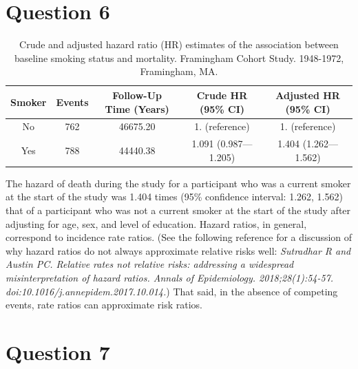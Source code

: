\documentclass{article}\usepackage[]{graphicx}\usepackage[]{color}
\newif\ifdraft  %
\begin{document}
\pagebreak

\section*{Question 6}

\ifdraft

Complete the following table. How would you interpret the parameter estimate that compares smokers to non-smokers in the \textbf{adjusted model}? What measure of association common in epidemiologic research does this correspond to? \textbf{(10 points)}

\fi







\begin{table}[H]
\centering
\parbox{13cm}{\caption{Crude and adjusted hazard ratio (HR) estimates of the association between baseline smoking status and mortality. Framingham Cohort Study. 1948-1972, Framingham, MA.}} 
\begin{tabular}{ccccc}
  \hline
Smoker & Events & Follow-Up Time (Years) & Crude HR (95\% CI) & Adjusted HR (95\% CI) \\ 
  \hline
No & 762 & 46675.20 & 1. (reference) & 1. (reference) \\ 
  Yes & 788 & 44440.38 & 1.091 (0.987—1.205) & 1.404 (1.262—1.562) \\ 
   \hline
\end{tabular}
\end{table}


The hazard of death during the study for a participant who was a current smoker at the start of the study was 1.404 times (95\% confidence interval: 1.262, 1.562) that of a participant who was not a current smoker at the start of the study after adjusting for age, sex, and level of education.  Hazard ratios, in general, correspond to incidence rate ratios.  (See the following reference for a discussion of why hazard ratios do not always approximate relative risks well: \textit{Sutradhar R and Austin PC. Relative rates not relative risks: addressing a widespread misinterpretation of hazard ratios. Annals of Epidemiology. 2018;28(1):54-57. doi:10.1016/j.annepidem.2017.10.014.})  That said, in the absence of competing events, rate ratios can approximate risk ratios.

\pagebreak

\section*{Question 7}
\end{document}
